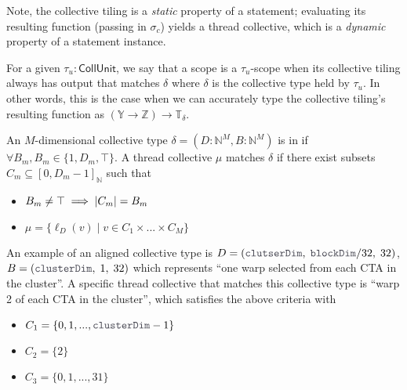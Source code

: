 \filbreak
Note, the collective tiling is a \textit{static} property of a statement; evaluating its resulting function (passing in $\sigma_c$) yields a thread collective, which is a \textit{dynamic} property of a statement instance.

\filbreak
For a given $\tau_u : \mathsf{CollUnit}$, we say that a scope is a $\tau_u$-scope when its collective tiling always has output that matches $\delta$ where $\delta$ is the collective type held by $\tau_u$.
In other words, this is the case when we can accurately type the collective tiling's resulting function as $(\mathbb{Y} \to \mathbb{Z}) \to \mathbb{T}_\delta$.

\filbreak
{}

An $M$-dimensional collective type $\delta = (D: \mathbb{N}^M, B: \mathbb{N}^M)$ is in  if $\forall B_m, B_m \in \{1, D_m, \top\}$.
A thread collective $\mu$ matches $\delta$ if there exist subsets $C_m \subseteq [0, D_m - 1]_\mathbb{N}$ such that
\begin{itemize}
  \item $B_m \ne \top \implies \left \vert C_m \right\vert = B_m$
  \item $\mu = \{ \ell_D(v) \mid v \in C_1 \times ... \times C_M \}$
\end{itemize}

An example of an aligned collective type is $D = (\lighttt{clutserDim},\;\lighttt{blockDim} / 32,\;32)$, $B = (\lighttt{clusterDim},\;1,\;32)$ which represents ``one warp selected from each CTA in the cluster''.
A specific thread collective that matches this collective type is ``warp 2 of each CTA in the cluster'', which satisfies the above criteria with
\begin{itemize}
  \item $C_1 = \{ 0, 1, ..., \lighttt{clusterDim}-1 \}$
  \item $C_2 = \{ 2 \}$
  \item $C_3 = \{ 0, 1, ..., 31 \}$
\end{itemize}

\filbreak
{}

